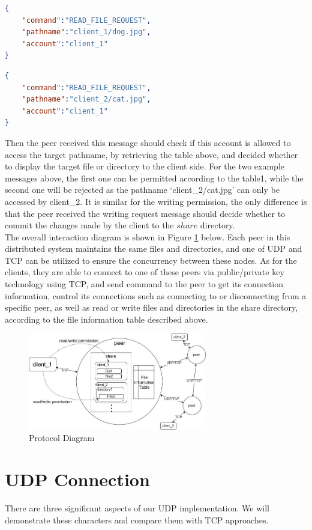 \documentclass[a4paper,10pt,titlepage,twocolumn]{article}
\begin{document}
    \begin{lstlisting}[language=json,firstnumber=1,title=Message 1]
{
    "command":"READ_FILE_REQUEST",
    "pathname":"client_1/dog.jpg",
    "account":"client_1"
}
    \end{lstlisting}
    \begin{lstlisting}[language=json,firstnumber=1,title=Message 2]
{
    "command":"READ_FILE_REQUEST",
    "pathname":"client_2/cat.jpg",
    "account":"client_1"
}
    \end{lstlisting}
    Then the peer received this message should check if this account is allowed to access the target pathname, by retrieving the table above, and decided whether to display the target file or directory to the client side. For the two example messages above, the first one can be permitted according to the table1, while the second one will be rejected as the pathname ‘client\_2/cat.jpg’ can only be accessed by client\_2. It is similar for the writing permission, the only difference is that the peer received the writing request message should decide whether to commit the changes made by the client to the $share$ directory.
    \\The overall interaction diagram is shown in Figure \ref{figure} below. Each peer in this distributed system maintains the same files and directories, and one of UDP and TCP can be utilized to ensure the concurrency between these nodes. As for the clients, they are able to connect to one of these peers via public/private key technology using TCP, and send command to the peer to get its connection information, control its connections such as connecting to or disconnecting from a specific peer, as well as read or write files and directories in the share directory, according to the file information table described above.
    \begin{figure}[h]
        \includegraphics[width=7.8cm]{pic}
        \caption{Protocol Diagram}\label{figure}
    \end{figure}
    \section{UDP Connection}
    There are three significant aspects of our UDP implementation. We will demonstrate these characters and compare them with TCP approaches. 
\end{document}

